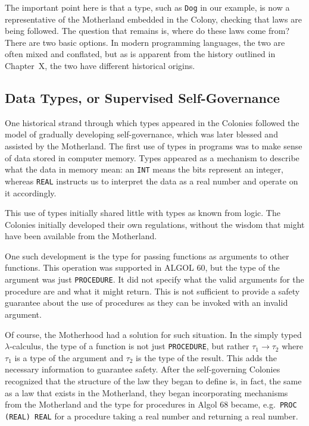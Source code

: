 \documentclass[]{article}
\begin{document}
The important point here is that a type, such as \texttt{Dog} in our example, is now a representative of the Motherland embedded in the Colony, checking that laws are being followed. The question that remains is, where do these laws come from? There are two basic options. In modern programming languages, the two are often mixed and conflated, but as is apparent from the history outlined in Chapter~X, the two have different historical origins.

\subsection{Data Types, or Supervised Self-Governance}

One historical strand through which types appeared in the Colonies followed the model of gradually developing self-governance, which was later blessed and assisted by the Motherland. The first use of types in programs was to make sense of data stored in computer memory. Types appeared as a mechanism to describe what the data in memory mean: an \texttt{INT} means the bits represent an integer, whereas \texttt{REAL} instructs us to interpret the data as a real number and operate on it accordingly.

This use of types initially shared little with types as known from logic. The Colonies initially developed their own regulations, without the wisdom that might have been available from the Motherland.

One such development is the type for passing functions as arguments to other functions. This operation was supported in ALGOL 60, but the type of the argument was just \texttt{PROCEDURE}. It did not specify what the valid arguments for the procedure are and what it might return. This is not sufficient to provide a safety guarantee about the use of procedures as they can be invoked with an invalid argument.

Of course, the Motherhood had a solution for such situation. In the simply typed $\lambda$-calculus, the type of a function is not just \texttt{PROCEDURE}, but rather $\tau_1 \rightarrow \tau_2$ where $\tau_1$ is a type of the argument and $\tau_2$ is the type of the result. This adds the necessary information to guarantee safety. After the self-governing Colonies recognized that the structure of the law they began to define is, in fact, the same as a law that exists in the Motherland, they began incorporating mechanisms from the Motherland and the type for procedures in Algol 68 became, e.g.~\texttt{PROC (REAL) REAL} for a procedure taking a real number and returning a real number.
\end{document}
